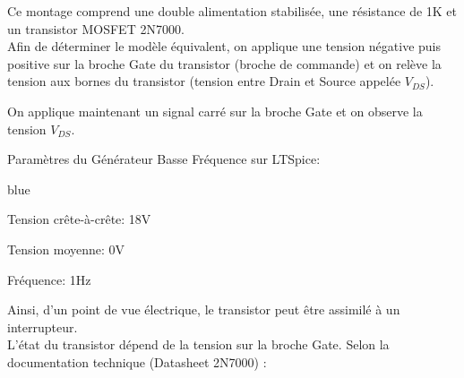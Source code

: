 Ce montage comprend une double alimentation stabilisée, une résistance de 1K et un transistor MOSFET 2N7000.\\

Afin de déterminer le modèle équivalent, on applique une tension négative puis positive sur la broche Gate du transistor (broche de commande) 
et on relève la tension aux bornes du transistor (tension entre Drain et Source appelée $V_{DS}$).\\



On applique maintenant un signal carré sur la broche Gate et on observe la tension $V_{DS}$.

Paramètres du Générateur Basse Fréquence sur LTSpice:

\begin{items}{blue}{\Bullet}
\item Tension crête-à-crête: 18V
\item Tension moyenne: 0V
\item Fréquence: 1Hz
\end{items}



Ainsi, d’un point de vue électrique, le transistor peut être assimilé à un interrupteur.\\
L’état du transistor dépend de la tension sur la broche Gate. Selon la documentation technique (Datasheet 2N7000) :


